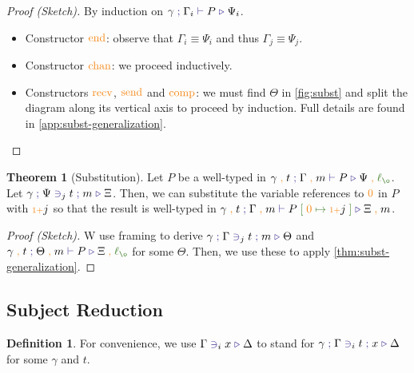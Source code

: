 \documentclass[a4paper,UKenglish,cleveref,autoref,thm-restate,authorcolumns]{lipics-v2019}
\theoremstyle{definition}
\newtheorem{nidefinition}{Definition}
\newtheorem{nitheorem}{Theorem}
\newcommand{\type}[1]{\textcolor{BlueViolet}{\operatorname{#1}}}
\newcommand{\constr}[1]{\textcolor{BurntOrange}{\operatorname{#1}}}
\newcommand{\func}[1]{\textcolor{OliveGreen}{\operatorname{#1}}}
\newcommand{\suc}{\constr{\scriptstyle 1+}}
\newcommand{\comma}{\; \constr{,} \;}
\newcommand{\subst}[3]{#1 \; \func{[} \; #3 \; \func{\mapsto} \;#2 \; \func{]}}
\newcommand{\lz}{\func{\ell_{\o}}}
\newcommand{\types}[4]{#1 \; \type{;} \; #2 \; \type{\vdash} \; #3 \; \type{\triangleright} \; #4}
\newcommand{\contains}[6]{#1 \; \type{;} \; #2 \; \type{\ni}_{#3} \; #4 \; \type{;} \; #5 \; \type{\triangleright} \; #6}
\newcommand{\containsusage}[4]{#1 \; \type{\ni}_{#2} \; #3 \; \type{\triangleright} \; #4}
\begin{document}
\begin{proof}[Proof (Sketch)]
  By induction on $\types{\gamma}{\Gamma_i}{P}{\Psi_i}$.
  \begin{itemize}
    \item
      Constructor $\constr{end}$: observe that $\Gamma_i \equiv \Psi_i$ and thus $\Gamma_j \equiv \Psi_j$.

    \item
      Constructor $\constr{chan}$: we proceed inductively.
      
    \item
      Constructors $\constr{recv}$, $\constr{send}$ and $\constr{comp}$: we must find $\Theta$ in \autoref{fig:subst} and split the diagram along its vertical axis to proceed by induction.
      Full details are found in \autoref{app:subst-generalization}. \qedhere
  \end{itemize}
\end{proof}

\begin{nitheorem}[Substitution]
  \label{thm:substitution}
  Let $P$ be a well-typed in $\types{\gamma \comma t}{\Gamma \comma m}{P}{\Psi \comma \lz}$.
  Let $\contains{\gamma}{\Psi}{j}{t}{m}{\Xi}$.
  Then, we can substitute the variable references to $\constr{0}$ in $P$ with $\suc j$ so that the result is well-typed in $\types{\gamma \comma t}{\Gamma \comma m}{\subst{P}{\suc j}{\constr{0}}}{\Xi \comma m}$.
\end{nitheorem}
\begin{proof}[Proof (Sketch)]
  W use framing to derive $\contains{\gamma}{\Gamma}{j}{t}{m}{\Theta}$ and $\types{\gamma \comma t}{\Theta \comma m}{P}{\Xi \comma \lz}$ for some $\Theta$.
  Then, we use these to apply \autoref{thm:subst-generalization}.
\end{proof}

\subsection{Subject Reduction}
\label{subject-reduction}

\begin{nidefinition}
  For convenience, we use $\containsusage{\Gamma}{i}{x}{\Delta}$ to stand for $\contains{\gamma}{\Gamma}{i}{t}{x}{\Delta}$ for some $\gamma$ and $t$.
\end{nidefinition}
\end{document}
